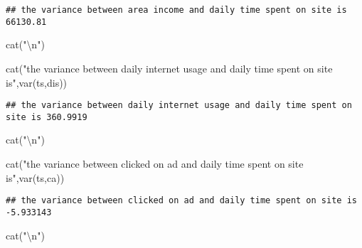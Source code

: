 \documentclass[
]{article}
\newenvironment{Shaded}{\begin{snugshade}}{\end{snugshade}}
\newcommand{\FunctionTok}[1]{\textcolor[rgb]{0.00,0.00,0.00}{#1}}
\newcommand{\NormalTok}[1]{#1}
\newcommand{\SpecialCharTok}[1]{\textcolor[rgb]{0.00,0.00,0.00}{#1}}
\newcommand{\StringTok}[1]{\textcolor[rgb]{0.31,0.60,0.02}{#1}}
\begin{document}
\begin{verbatim}
## the variance between area income and daily time spent on site is 66130.81
\end{verbatim}

\begin{Shaded}
\begin{Highlighting}[]
\FunctionTok{cat}\NormalTok{(}\StringTok{"}\SpecialCharTok{\textbackslash{}n}\StringTok{"}\NormalTok{)}
\end{Highlighting}
\end{Shaded}

\begin{Shaded}
\begin{Highlighting}[]
\FunctionTok{cat}\NormalTok{(}\StringTok{"the variance between daily internet usage and daily time spent on site is"}\NormalTok{,}\FunctionTok{var}\NormalTok{(ts,dis))}
\end{Highlighting}
\end{Shaded}

\begin{verbatim}
## the variance between daily internet usage and daily time spent on site is 360.9919
\end{verbatim}

\begin{Shaded}
\begin{Highlighting}[]
\FunctionTok{cat}\NormalTok{(}\StringTok{"}\SpecialCharTok{\textbackslash{}n}\StringTok{"}\NormalTok{)}
\end{Highlighting}
\end{Shaded}

\begin{Shaded}
\begin{Highlighting}[]
\FunctionTok{cat}\NormalTok{(}\StringTok{"the variance between clicked on ad and daily time spent on site is"}\NormalTok{,}\FunctionTok{var}\NormalTok{(ts,ca))}
\end{Highlighting}
\end{Shaded}

\begin{verbatim}
## the variance between clicked on ad and daily time spent on site is -5.933143
\end{verbatim}

\begin{Shaded}
\begin{Highlighting}[]
\FunctionTok{cat}\NormalTok{(}\StringTok{"}\SpecialCharTok{\textbackslash{}n}\StringTok{"}\NormalTok{)}
\end{Highlighting}
\end{Shaded}
\end{document}
